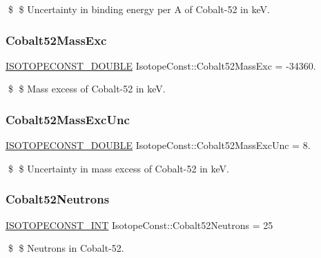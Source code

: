 \$ \$ Uncertainty in binding energy per A of Cobalt-\/52 in keV. \mbox{\label{group___isotope_const-_cobalt-_co52_gac9021cbf03ac514787eb0f5370099e41}} 
\subsubsection{\texorpdfstring{Cobalt52\+Mass\+Exc}{Cobalt52MassExc}}
{\footnotesize\ttfamily \mbox{\hyperlink{group___isotope_const-_macros_ga8f45a7272ce02c0b4c65c44636ed719a}{I\+S\+O\+T\+O\+P\+E\+C\+O\+N\+S\+T\+\_\+\+D\+O\+U\+B\+LE}} Isotope\+Const\+::\+Cobalt52\+Mass\+Exc = -\/34360.}

\$ \$ Mass excess of Cobalt-\/52 in keV. \mbox{\label{group___isotope_const-_cobalt-_co52_gac3fccd2df3cebfabe1620b24121df30e}} 
\subsubsection{\texorpdfstring{Cobalt52\+Mass\+Exc\+Unc}{Cobalt52MassExcUnc}}
{\footnotesize\ttfamily \mbox{\hyperlink{group___isotope_const-_macros_ga8f45a7272ce02c0b4c65c44636ed719a}{I\+S\+O\+T\+O\+P\+E\+C\+O\+N\+S\+T\+\_\+\+D\+O\+U\+B\+LE}} Isotope\+Const\+::\+Cobalt52\+Mass\+Exc\+Unc = 8.}

\$ \$ Uncertainty in mass excess of Cobalt-\/52 in keV. \mbox{\label{group___isotope_const-_cobalt-_co52_ga8285a937a1e390729bb57fb4feffc442}} 
\subsubsection{\texorpdfstring{Cobalt52\+Neutrons}{Cobalt52Neutrons}}
{\footnotesize\ttfamily \mbox{\hyperlink{group___isotope_const-_macros_ga5f18360b3e99483a35c32d789e62621c}{I\+S\+O\+T\+O\+P\+E\+C\+O\+N\+S\+T\+\_\+\+I\+NT}} Isotope\+Const\+::\+Cobalt52\+Neutrons = 25}

\$ \$ Neutrons in Cobalt-\/52. \mbox{\label{group___isotope_const-_cobalt-_co52_gaf061704eab22b7b291a86b9cf0094f90}} 

